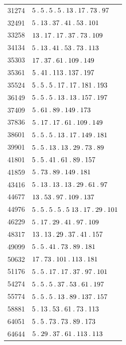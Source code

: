 \begin{longtable}{@{}r|l@{}}
31274 & $5\pdot 5\pdot 5\pdot 5\pdot 13\pdot 17\pdot 73\pdot 97$\\
32491 & $5\pdot 13\pdot 37\pdot 41\pdot 53\pdot 101$\\
33258 & $13\pdot 17\pdot 17\pdot 37\pdot 73\pdot 109$\\
34134 & $5\pdot 13\pdot 41\pdot 53\pdot 73\pdot 113$\\
35303 & $17\pdot 37\pdot 61\pdot 109\pdot 149$\\
35361 & $5\pdot 41\pdot 113\pdot 137\pdot 197$\\
35524 & $5\pdot 5\pdot 5\pdot 17\pdot 17\pdot 181\pdot 193$\\
36149 & $5\pdot 5\pdot 5\pdot 13\pdot 13\pdot 157\pdot 197$\\
37409 & $5\pdot 61\pdot 89\pdot 149\pdot 173$\\
37836 & $5\pdot 17\pdot 17\pdot 61\pdot 109\pdot 149$\\
38601 & $5\pdot 5\pdot 5\pdot 13\pdot 17\pdot 149\pdot 181$\\
39901 & $5\pdot 5\pdot 13\pdot 13\pdot 29\pdot 73\pdot 89$\\
41801 & $5\pdot 5\pdot 41\pdot 61\pdot 89\pdot 157$\\
41859 & $5\pdot 73\pdot 89\pdot 149\pdot 181$\\
43416 & $5\pdot 13\pdot 13\pdot 13\pdot 29\pdot 61\pdot 97$\\
44677 & $13\pdot 53\pdot 97\pdot 109\pdot 137$\\
44976 & $5\pdot 5\pdot 5\pdot 5\pdot 5\;13\pdot 17\pdot 29\pdot 101$\\
46229 & $5\pdot 17\pdot 29\pdot 41\pdot 97\pdot 109$\\
48317 & $13\pdot 13\pdot 29\pdot 37\pdot 41\pdot 157$\\
49099 & $5\pdot 5\pdot 41\pdot 73\pdot 89\pdot 181$\\
50632 & $17\pdot 73\pdot 101\pdot 113\pdot 181$\\
51176 & $5\pdot 5\pdot 17\pdot 17\pdot 37\pdot 97\pdot 101$\\
54274 & $5\pdot 5\pdot 5\pdot 37\pdot 53\pdot 61\pdot 197$\\
55774 & $5\pdot 5\pdot 5\pdot 13\pdot 89\pdot 137\pdot 157$\\
58881 & $5\pdot 13\pdot 53\pdot 61\pdot 73\pdot 113$\\
64051 & $5\pdot 5\pdot 73\pdot 73\pdot 89\pdot 173$\\
64644 & $5\pdot 29\pdot 37\pdot 61\pdot 113\pdot 113$\\

\end{longtable}
